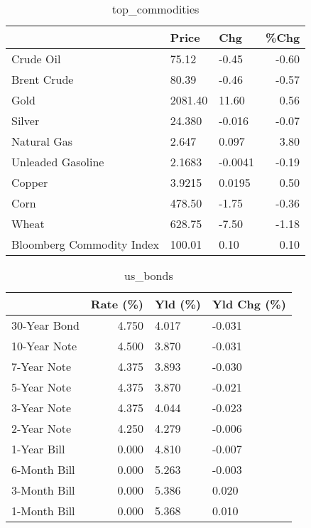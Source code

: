 \documentclass{article}%
\begin{document}
\begin{table}[htbp]%
\caption{top\_commodities}%
\centering%
\begin{adjustbox}{width=1\textwidth}%
\begin{tabular}{lllr}
\toprule
                          &   Price &     Chg &  \%Chg \\
\midrule
               Crude Oil  &   75.12 &   -0.45 & -0.60 \\
             Brent Crude  &   80.39 &   -0.46 & -0.57 \\
                    Gold  & 2081.40 &   11.60 &  0.56 \\
                  Silver  &  24.380 &  -0.016 & -0.07 \\
             Natural Gas  &   2.647 &   0.097 &  3.80 \\
       Unleaded Gasoline  &  2.1683 & -0.0041 & -0.19 \\
                  Copper  &  3.9215 &  0.0195 &  0.50 \\
                    Corn  &  478.50 &   -1.75 & -0.36 \\
                   Wheat  &  628.75 &   -7.50 & -1.18 \\
Bloomberg Commodity Index &  100.01 &    0.10 &  0.10 \\
\bottomrule
\end{tabular}
%
\end{adjustbox}%
\end{table}

%


\begin{table}[htbp]%
\caption{us\_bonds}%
\centering%
\begin{adjustbox}{width=1\textwidth}%
\begin{tabular}{lrll}
\toprule
             &  Rate (\%) & Yld (\%) & Yld Chg (\%) \\
\midrule
30-Year Bond &     4.750 &   4.017 &      -0.031 \\
10-Year Note &     4.500 &   3.870 &      -0.031 \\
 7-Year Note &     4.375 &   3.893 &      -0.030 \\
 5-Year Note &     4.375 &   3.870 &      -0.021 \\
 3-Year Note &     4.375 &   4.044 &      -0.023 \\
 2-Year Note &     4.250 &   4.279 &      -0.006 \\
 1-Year Bill &     0.000 &   4.810 &      -0.007 \\
6-Month Bill &     0.000 &   5.263 &      -0.003 \\
3-Month Bill &     0.000 &   5.386 &       0.020 \\
1-Month Bill &     0.000 &   5.368 &       0.010 \\
\bottomrule
\end{tabular}
%
\end{adjustbox}%
\end{table}
\end{document}
